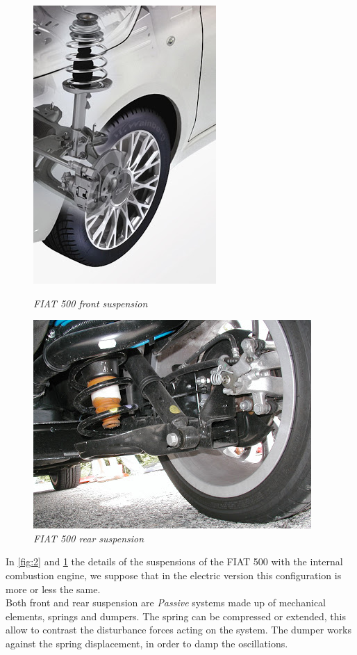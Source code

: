\documentclass{article}
\numberwithin{equation}{section}
\numberwithin{figure}{section}
\numberwithin{table}{section}
\numberwithin{table}{section}
\begin{document}
\begin{figure}[H]
\centering
\begin{minipage}{.5\textwidth}
  \centering
  \includegraphics[width=.4\linewidth]{Pictures/Fiat500USA-Fiat 500 front suspension.png}
  \caption{\emph{FIAT 500 front suspension}}
  \label{fig:2}
\end{minipage}%
\begin{minipage}{.5\textwidth}
  \centering
  \includegraphics[width=.8\linewidth]{Pictures/Fiat500USA-500_RR_without_Saybar.jpg}
  \caption{\emph{FIAT 500 rear suspension}}
  \label{fig:3}
\end{minipage}
\end{figure}
In \cref{fig:2} and \cref{fig:3} the details of the suspensions of the FIAT 500 with the internal combustion engine, we suppose that in the electric version this configuration is more or less the same.\\
Both front and rear suspension are \emph{Passive} systems made up of mechanical elements, springs and dumpers. The spring can be compressed or extended, this allow to contrast the disturbance forces acting on the system. The dumper works against the spring displacement, in order to damp the oscillations.\\
\end{document}
